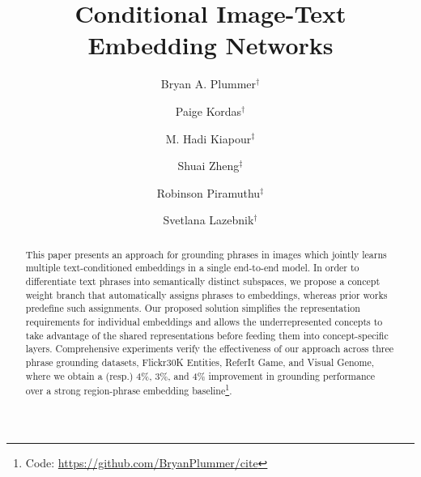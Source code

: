 \documentclass[runningheads]{llncs}
\makeatletter
\DeclareRobustCommand\onedot{\futurelet\@let@token\@onedot}
\def\@onedot{\ifx\@let@token.\else.\null\fi\xspace}
\def\etal{\emph{et al}\onedot}
\makeatother
\begin{document}
\title{Conditional Image-Text Embedding Networks}


\authorrunning{B.\ A.\ Plummer~\etal}

\author{Bryan A. Plummer$^\dagger$
\and
Paige Kordas$^\dagger$
\and
M. Hadi Kiapour$^\ddagger$
\and 
Shuai Zheng$^\ddagger$
\and 
Robinson Piramuthu$^\ddagger$
\and 
Svetlana Lazebnik$^\dagger$}




\maketitle              %
\begin{abstract}
This paper presents an approach for grounding phrases in images which jointly learns multiple text-conditioned embeddings in a single end-to-end model.  In order to differentiate text phrases into semantically distinct subspaces, we propose a concept weight branch that automatically assigns phrases to embeddings, whereas prior works predefine such assignments.  Our proposed solution simplifies the representation requirements for individual embeddings and allows the underrepresented concepts to take advantage of the shared representations before feeding them into concept-specific layers. Comprehensive experiments verify the effectiveness of our approach across three phrase grounding datasets, Flickr30K Entities, ReferIt Game, and Visual Genome, where we obtain a (resp.) 4\%, 3\%, and 4\% improvement in grounding performance over a strong region-phrase embedding baseline\footnote{Code:  \url{https://github.com/BryanPlummer/cite}}.
\end{abstract}
\end{document}
